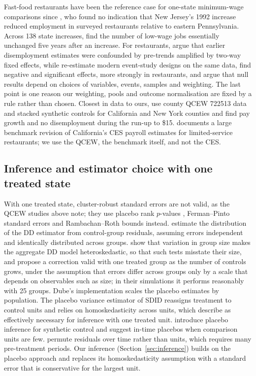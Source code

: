 Fast-food restaurants have been the reference case for one-state minimum-wage comparisons since
\citet{card1994minimum}, who found no indication that New Jersey's 1992 increase reduced
employment in surveyed restaurants relative to eastern Pennsylvania. Across 138 state increases,
\citet{cengiz2019effect} find the number of low-wage jobs essentially unchanged five years after an
increase. For restaurants, \citet{dube2024restaurant} argue that earlier disemployment estimates
were confounded by pre-trends amplified by two-way fixed effects, while
\citet{neumark2026modern} re-estimate modern event-study designs on the same data, find negative
and significant effects, more strongly in restaurants, and argue that null results depend on
choices of variables, events, samples and weighting. The last point is one reason our weighting,
pools and outcome normalisation are fixed by a rule rather than chosen. Closest in data to ours,
\citet{wiltshire2026minimum} use county QCEW 722513 data and stacked synthetic controls for
California and New York counties and find pay growth and no disemployment during the run-up to
\$15. \citet{thornberg2025jumping} documents a large benchmark revision of California's CES
payroll estimates for limited-service restaurants; we use the QCEW, the benchmark itself, and not
the CES.

\subsection{Inference and estimator choice with one treated state}
\label{sec:lit-methods}

With one treated state, cluster-robust standard errors are not valid, as the QCEW studies above
note; they use placebo rank $p$-values \citep{clemens2025did}, Ferman--Pinto standard errors
\citep{dube2026labor} and Rambachan--Roth bounds \citep{sosinskiy2026effects} instead. \citet{conley2011inference}
estimate the distribution of the DD estimator from control-group residuals, assuming errors
independent and identically distributed across groups. \citet{ferman2019inference} show that
variation in group size makes the aggregate DD model heteroskedastic, so that such tests misstate
their size, and propose a correction valid with one treated group as the number of controls grows,
under the assumption that errors differ across groups only by a scale that depends on observables
such as size; in their simulations it performs reasonably with 25 groups. Dube's implementation
scales the placebo estimates by population. The placebo variance estimator of SDID reassigns
treatment to control units and relies on homoskedasticity across units, which
\citet{arkhangelsky2021synthetic} describe as effectively necessary for inference with one treated
unit. \citet{abadie2010synthetic} introduce placebo inference for synthetic control and suggest
in-time placebos when comparison units are few. \citet{chernozhukov2021exact} permute residuals over
time rather than units, which requires many pre-treatment periods. Our inference
(Section~\ref{sec:inference}) builds on the placebo approach and replaces its homoskedasticity
assumption with a standard error that is conservative for the largest unit.

